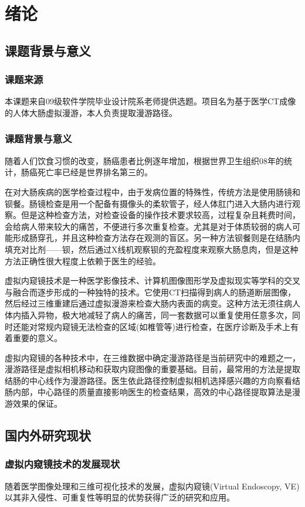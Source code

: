 \chapter{绪论}

\section{课题背景与意义}
\subsection{课题来源}
本课题来自09级软件学院毕业设计院系老师提供选题。项目名为基于医学CT成像的人体大肠虚拟漫游，本人负责提取漫游路径。

\subsection{课题背景与意义}
随着人们饮食习惯的改变，肠癌患者比例逐年增加，根据世界卫生组织08年的统计，肠癌死亡率已经是世界排名第三的。

在对大肠疾病的医学检查过程中，由于发病位置的特殊性，传统方法是使用肠镜和钡餐。肠镜检查是用一个配备有摄像头的柔软管子，经人体肛门进入大肠内进行观察。但是这种检查方法，对检查设备的操作技术要求较高，过程复杂且耗费时间，会给病人带来较大的痛苦，不便进行多次重复检查。尤其是对于体质较弱的病人可能形成肠穿孔，并且这种检查方法存在观测的盲区。另一种方法钡餐则是在结肠内填充对比剂——钡，然后通过X线机观察钡的充盈程度来观察大肠息肉，但是这种方法正确性很大程度上依赖于医生的经验。

虚拟内窥镜技术是一种医学影像技术、计算机图像图形学及虚拟现实等学科的交叉与融合而逐步形成的一种独特的技术。它使用CT扫描得到病人的肠道断层图像，然后经过三维重建后通过虚拟漫游来检查大肠内表面的病变。这种方法无须往病人体内插入异物，极大地减轻了病人的痛苦，同一套数据可以重复使用任意多次，同时还能对常规内窥镜无法检查的区域(如椎管等)进行检查，在医疗诊断及手术上有着重要的意义。

虚拟内窥镜的各种技术中，在三维数据中确定漫游路径是当前研究中的难题之一，漫游路径是虚拟相机移动和获取内窥图像的重要基础。目前，最常用的方法是提取结肠的中心线作为漫游路径。医生依此路径控制虚拟相机选择感兴趣的方向察看结肠内部，中心路径的质量直接影响医生的检查结果，高效的中心路径提取算法是漫游效果的保证。

\section{国内外研究现状}
\subsection{虚拟内窥镜技术的发展现状}
随着医学图像处理和三维可视化技术的发展，虚拟内窥镜(Virtual Endoscopy, VE)以其非入侵性、可重复性等明显的优势获得广泛的研究和应用。

